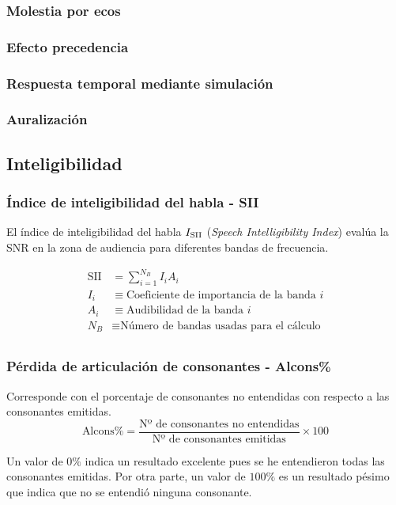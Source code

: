 \documentclass[a4paper, 8pt]{extarticle}
\begin{document}
\begin{multicols}{3}
  \subsubsection{Molestia por ecos}
  \subsubsection{Efecto precedencia}
  \subsubsection{Respuesta temporal mediante simulación}
  \subsubsection{Auralización}

  \subsection{Inteligibilidad}
  \subsubsection{Índice de inteligibilidad del habla - SII}
  El índice de inteligibilidad del habla $I_{\textnormal{SII}}$ (\textit{Speech Intelligibility Index}) evalúa la SNR en la zona de audiencia para diferentes bandas de frecuencia.

  \begin{align*}
    \text{SII} & = \sum_{i=1}^{N_B}I_i A_i                              \\
    I_i        & \equiv \text{Coeficiente de importancia de la banda }i \\
    A_i        & \equiv \text{Audibilidad de la banda }i                \\
    N_B        & \equiv \text{Número de bandas usadas para el cálculo}  \\
  \end{align*}

  \subsubsection{Pérdida de articulación de consonantes - Alcons\%}
  Corresponde con el porcentaje de consonantes no entendidas con respecto a las consonantes emitidas.
  \[ \text{Alcons}\% = \frac{\text{Nº de consonantes no entendidas}}{\text{Nº de consonantes emitidas}} \times 100 \]

  Un valor de $0\%$ indica un resultado excelente pues se he entendieron todas las consonantes emitidas. Por otra parte, un valor de $100\%$ es un resultado pésimo que indica que no se entendió ninguna consonante.


\end{multicols}
\end{document}
